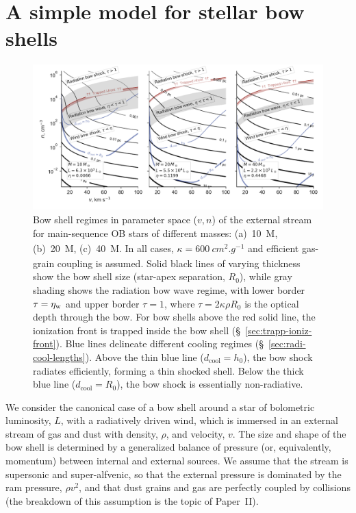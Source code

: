 \section{A simple model for stellar bow shells}
\label{sec:strong-gas-grain}

\begin{figure}
  \includegraphics[width=\linewidth]{figs/zones-v-n-plane}
  \caption{Bow shell regimes in parameter space (\(v, n\)) of the
    external stream for main-sequence OB stars of different masses:
    (a)~\SI{10}{M_\odot}, (b)~\SI{20}{M_\odot}, (c)~\SI{40}{M_\odot}.  In all
    cases, \(\kappa = \SI{600}{cm^2.g^{-1}}\) and efficient gas-grain
    coupling is assumed. Solid black lines of varying thickness show
    the bow shell size (star-apex separation, \(R_0\)), while gray
    shading shows the radiation bow wave regime, with lower border
    \(\tau = \eta_{\text{w}}\) and upper border \(\tau = 1\), where
    \(\tau = 2 \kappa \rho R_0\) is the optical depth through the bow.  For bow
    shells above the red solid line, the ionization front is trapped
    inside the bow shell (\S~\ref{sec:trapp-ioniz-front}).  Blue lines
    delineate different cooling regimes
    (\S~\ref{sec:radi-cool-lengths}).  Above the thin blue line
    (\(d_{\text{cool}} = h_0\)), the bow shock radiates efficiently,
    forming a thin shocked shell.  Below the thick blue line
    (\(d_{\text{cool}} = R_0\)), the bow shock is essentially
    non-radiative.}
  \label{fig:zones-v-n-plane}
\end{figure}


We consider the canonical case of a bow shell around a star of
bolometric luminosity, \(L\), with a radiatively driven wind, which is
immersed in an external stream of gas and dust with density, \(\rho\),
and velocity, \(v\).  The size and shape of the bow shell is
determined by a generalized balance of pressure (or, equivalently,
momentum) between internal and external sources.  We assume that the
stream is supersonic and super-alfvenic, so that the external pressure
is dominated by the ram pressure, \(\rho v^2\), and that dust grains and
gas are perfectly coupled by collisions (the breakdown of this
assumption is the topic of Paper~II).

